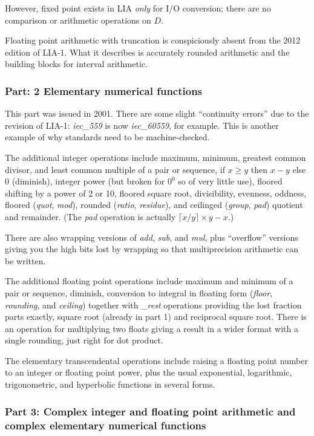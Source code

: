 \documentclass{article}
\begin{document}
However, fixed point exists in LIA {\it only} for I/O conversion;
there are no comparison or arithmetic operations on $D$.

Floating point arithmetic with truncation is conspiciously
absent from the 2012 edition of LIA-1.  What it describes is
accurately rounded arithmetic and the building blocks for
interval arithmetic.

\subsubsection{Part: 2 Elementary numerical functions}

This part was issued in 2001.  There are some slight ``continuity
errors'' due to the revision of LIA-1: {\it iec\_559}\subF{} is
now {\it iec\_60559}\subF{}, for example.  This is another example
of why standards need to be machine-checked.

The additional integer operations include maximum, minimum,
greatest common divisor, and least common multiple
of a pair or sequence, if $x\ge y$ then $x-y$ else 0 (diminish),
integer power (but broken for $0^0$ so of very little use),
floored shifting by a power of 2 or 10, floored square root,
divisibility, evenness, oddness, floored ({\it quot}\subI{},
{\it mod}\subI{}), rounded ({\it ratio}\subI{}, {\it residue}\subI{}),
and ceilinged ({\it group}\subI{}, {\it pad}) quotient and remainder.
(The {\it pad} operation is actually $\lceil x/y \rceil\times y - x$.)

There are also wrapping versions of {\it add}, {\it sub}, and
{\it mul}, plus ``overflow'' versions giving you the high bits
lost by wrapping so that multiprecision arithmetic can be written.

The additional floating point operations include maximum and
minimum of a pair or sequence, diminish,  conversion to integral
in floating form ({\it floor}\subF{}, {\it rounding}\subF{}, and
{\it ceiling}\subF{}) together with {\it *\_rest}\subF{} operations
providing the lost fraction parts exactly, square root (already
in part 1) and reciprocal square root.  There is an operation
for multiplying two floats giving a result in a wider format with
a single rounding, just right for dot product.

The elementary transcendental operations include raising a
floating point number to an integer or floating point power,
plus the usual exponential, logarithmic, trigonometric, and
hyperbolic functions in several forms.

\subsubsection{Part 3: Complex integer and floating point
arithmetic and complex elementary numerical functions}
\end{document}
